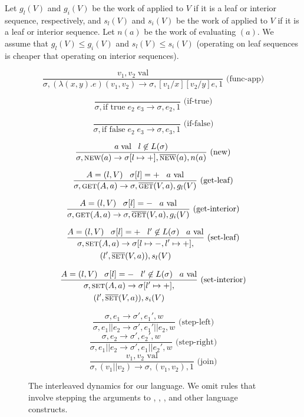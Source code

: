 Let $g_l(V)$ and $g_i(V)$ be the work of \get{} applied to $V$ if it
is a leaf or interior sequence, respectively, and $s_l(V)$ and $s_i(V)$
be the work of \set{} applied to $V$ if it is a leaf or interior
sequence.  Let $n(a)$ be the work of evaluating \new{}$(a)$.  We assume
that $g_l(V) \leq g_i(V)$ and $s_l(V) \leq s_i(V)$ (operating on leaf
sequences is cheaper that operating on interior sequences).

\begin{figure}
$$\frac{v_1, v_2 \; \text{val}}{\sigma, (\lambda (x,y).e)(v_1,v_2) \to \sigma, [v_1/x][v_2/y]e, 1} \text{ (func-app)}$$

$$\frac{}{\sigma, \text{if } \text{true} \; e_2 \; e_3 \to \sigma, e_2, 1} \text{ (if-true)}$$

$$\frac{}{\sigma, \text{if } \text{false} \; e_2 \; e_3 \to \sigma, e_3, 1}  \text{ (if-false)}$$

$$\frac{a \; \text{val} \;\;\; l \not\in L(\sigma)}{\sigma, \text{{\sc new}}{}(a) \to \sigma[l \mapsto +], \overline{\mbox{{\sc new}{}}}(a), n(a)} \text{ (new)}$$

$$\frac{A = (l, V) \;\;\; \sigma[l] = + \;\;\; a \text{ val}}{\sigma, \text{{\sc get}}{}(A, a) \to \sigma, \overline{\mbox{{\sc get}{}}}(V,a), g_l(V)} \text{ (get-leaf)}$$

$$\frac{A = (l, V) \;\;\; \sigma[l] = -  \;\;\; a \text{ val}}{\sigma, \text{{\sc get}}(A, a) \to \sigma, \overline{\mbox{{\sc get}{}}}(V,a), g_i(V)} \text{ (get-interior)}$$

$$\frac{A = (l, V) \;\;\; \sigma[l] = + \;\;\;  l' \not\in L(\sigma) \;\;\; a \text{ val}}{\begin{gathered}\sigma, \text{{\sc set}}(A, a) \to \sigma[l \mapsto -, l' \mapsto +], \\ (l', \overline{\mbox{{\sc set}{}}}(V, a)), s_l(V)\end{gathered}} \text{ (set-leaf)}$$

$$\frac{A = (l, V) \;\;\; \sigma[l] = - \;\;\;  l' \not\in L(\sigma) \;\;\; a \text{ val}}{\begin{gathered}\sigma, \text{{\sc set}}(A, a) \to \sigma[l' \mapsto +], \\ (l', \overline{\mbox{{\sc set}{}}}(V,a)), s_i(V)\end{gathered}} \text{ (set-interior)}$$

$$\frac{\sigma, e_1 \to \sigma', e_1', w}{\sigma, e_1 || e_2 \to \sigma', e_1' || e_2, w} \text{ (step-left)}$$
$$\frac{\sigma, e_2 \to \sigma', e_2', w}{\sigma, e_1 || e_2 \to \sigma', e_1 || e_2', w} \text{ (step-right)}$$
$$\frac{v_1, v_2 \text{ val}}{\sigma, (v_1 || v_2) \to \sigma, (v_1, v_2), 1} \text{ (join)}$$

\caption{The interleaved dynamics for our language.  We omit
  rules that involve stepping the arguments to \get{}, \set{}, \new{},
  and other language constructs.}
\label{fig:interleaved}
\end{figure}

